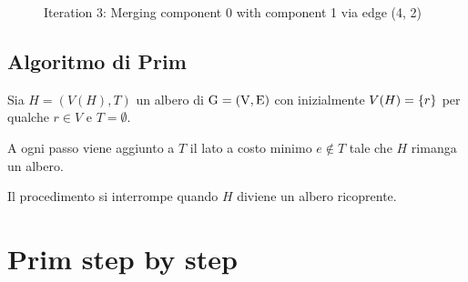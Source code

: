 \documentclass[\main/main.tex]{subfiles}
\begin{document}
\begin{figure}
\begin{subfigure}{0.25\textwidth}
  \end{subfigure}
  \caption{Iteration 3: Merging component 0 with component 1 via edge (4, 2)}
\end{figure}

\clearpage
\subsection{Algoritmo di Prim}
Sia \(H = (V(H), T)\) un albero di \(\operatorname*{G=\left(V, E\right)} \) con inizialmente \(V(H) = \left\{r\right\}\) per qualche \(r \in V \) e \(T = \emptyset \).

A ogni passo viene aggiunto a \(T\) il lato a costo minimo \(e \not\in T\) tale che \(H\) rimanga un albero.

Il procedimento si interrompe quando \(H\) diviene un albero ricoprente.

\section{Prim step by step}
\end{document}
